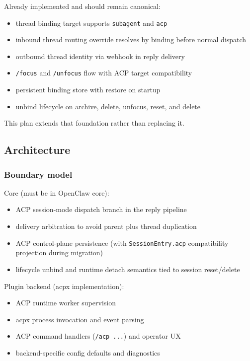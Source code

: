 Already implemented and should remain canonical:

\begin{itemize}
  \item thread binding target supports \texttt{subagent} and \texttt{acp}
  \item inbound thread routing override resolves by binding before normal dispatch
  \item outbound thread identity via webhook in reply delivery
  \item \texttt{/focus} and \texttt{/unfocus} flow with ACP target compatibility
  \item persistent binding store with restore on startup
  \item unbind lifecycle on archive, delete, unfocus, reset, and delete
\end{itemize}


This plan extends that foundation rather than replacing it.

\subsection{Architecture}


\subsubsection{Boundary model}


Core (must be in OpenClaw core):

\begin{itemize}
  \item ACP session-mode dispatch branch in the reply pipeline
  \item delivery arbitration to avoid parent plus thread duplication
  \item ACP control-plane persistence (with \texttt{SessionEntry.acp} compatibility projection during migration)
  \item lifecycle unbind and runtime detach semantics tied to session reset/delete
\end{itemize}


Plugin backend (acpx implementation):

\begin{itemize}
  \item ACP runtime worker supervision
  \item acpx process invocation and event parsing
  \item ACP command handlers (\texttt{/acp ...}) and operator UX
  \item backend-specific config defaults and diagnostics
\end{itemize}



